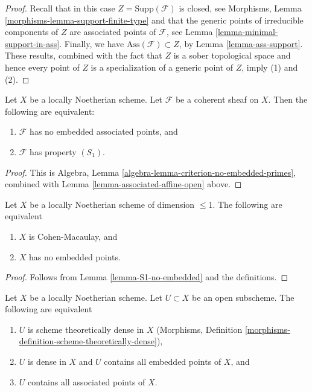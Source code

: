 \begin{proof}
Recall that in this case $Z = \text{Supp}(\mathcal{F})$ is closed, see
Morphisms, Lemma \ref{morphisms-lemma-support-finite-type}
and that the generic points of irreducible components of $Z$ are
associated points of $\mathcal{F}$, see
Lemma \ref{lemma-minimal-support-in-ass}.
Finally, we have $\text{Ass}(\mathcal{F}) \subset Z$, by
Lemma \ref{lemma-ass-support}.
These results, combined with the fact that $Z$ is a sober topological
space and hence every point of $Z$ is a specialization of a generic
point of $Z$, imply (1) and (2).
\end{proof}

\begin{lemma}
\label{lemma-S1-no-embedded}
Let $X$ be a locally Noetherian scheme.
Let $\mathcal{F}$ be a coherent sheaf on $X$.
Then the following are equivalent:
\begin{enumerate}
\item $\mathcal{F}$ has no embedded associated points, and
\item $\mathcal{F}$ has property $(S_1)$.
\end{enumerate}
\end{lemma}

\begin{proof}
This is Algebra, Lemma \ref{algebra-lemma-criterion-no-embedded-primes},
combined with Lemma \ref{lemma-associated-affine-open} above.
\end{proof}

\begin{lemma}
\label{lemma-noetherian-dim-1-CM-no-embedded-points}
Let $X$ be a locally Noetherian scheme of dimension $\leq 1$.
The following are equivalent
\begin{enumerate}
\item $X$ is Cohen-Macaulay, and
\item $X$ has no embedded points.
\end{enumerate}
\end{lemma}

\begin{proof}
Follows from Lemma \ref{lemma-S1-no-embedded} and the definitions.
\end{proof}

\begin{lemma}
\label{lemma-scheme-theoretically-dense-contain-embedded-points}
Let $X$ be a locally Noetherian scheme. Let $U \subset X$ be an
open subscheme. The following are equivalent
\begin{enumerate}
\item $U$ is scheme theoretically dense in $X$
(Morphisms, Definition \ref{morphisms-definition-scheme-theoretically-dense}),
\item $U$ is dense in $X$ and $U$ contains all embedded points of $X$, and
\item $U$ contains all associated points of $X$.
\end{enumerate}
\end{lemma}

